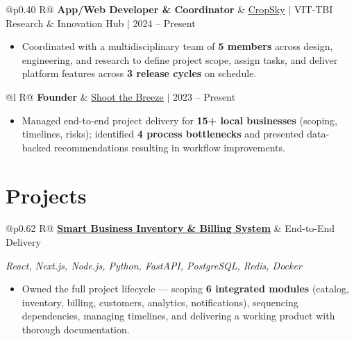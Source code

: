 \documentclass[a4paper,10pt]{article}
\newcommand{\ulink}[2]{\href{#1}{\uline{#2}}}
\newcommand{\subheading}[1]{{\color[HTML]{0A0A0A}\fontsize{12}{14}\selectfont\bfseries #1}}
\newcommand{\techstack}[1]{{\color[HTML]{5C5C5C}\fontsize{10.5}{12.5}\selectfont\itshape #1}}
\newcommand{\meta}[1]{{\color[HTML]{5C5C5C}\fontsize{10.5}{12.5}\selectfont #1}}
\begin{document}
\begin{tabularx}{\linewidth}{@{}p{0.40\linewidth} R@{}}
\subheading{App/Web Developer \& Coordinator} & \meta{\ulink{https://sites.google.com/view/cropsky/home}{CropSky} $|$ VIT-TBI Research \& Innovation Hub $|$ 2024 -- Present}
\end{tabularx}
\begin{itemize}[nosep, leftmargin=1.5em, itemsep=1pt, topsep=2pt]
  \item {\color[HTML]{0A0A0A}\fontsize{11}{14}\selectfont Coordinated with a multidisciplinary team of \textbf{5 members} across design, engineering, and research to define project scope, assign tasks, and deliver platform features across \textbf{3 release cycles} on schedule.}
\end{itemize}

\vspace{2pt}

\begin{tabularx}{\linewidth}{@{}l R@{}}
\subheading{Founder} & \meta{\ulink{https://shoot-the-breeze.vercel.app}{Shoot the Breeze} $|$ 2023 -- Present}
\end{tabularx}
\begin{itemize}[nosep, leftmargin=1.5em, itemsep=1pt, topsep=2pt]
  \item {\color[HTML]{0A0A0A}\fontsize{11}{14}\selectfont Managed end-to-end project delivery for \textbf{15+ local businesses} (scoping, timelines, risks); identified \textbf{4 process bottlenecks} and presented data-backed recommendations resulting in workflow improvements.}
\end{itemize}

\vspace{2pt}

\section{Projects}
\vspace{2pt}

\begin{tabularx}{\linewidth}{@{}p{0.62\linewidth} R@{}}
\subheading{\ulink{https://github.com/su-jin1425/Smart-Local-Business-Inventory-Billing-System}{Smart Business Inventory \& Billing System}} & \meta{End-to-End Delivery}
\end{tabularx}
\vspace{1pt}
\techstack{React, Next.js, Node.js, Python, FastAPI, PostgreSQL, Redis, Docker}
\begin{itemize}[nosep, leftmargin=1.5em, itemsep=1pt, topsep=2pt]
  \item {\color[HTML]{0A0A0A}\fontsize{11}{14}\selectfont Owned the full project lifecycle --- scoping \textbf{6 integrated modules} (catalog, inventory, billing, customers, analytics, notifications), sequencing dependencies, managing timelines, and delivering a working product with thorough documentation.}
\end{itemize}
\end{document}
